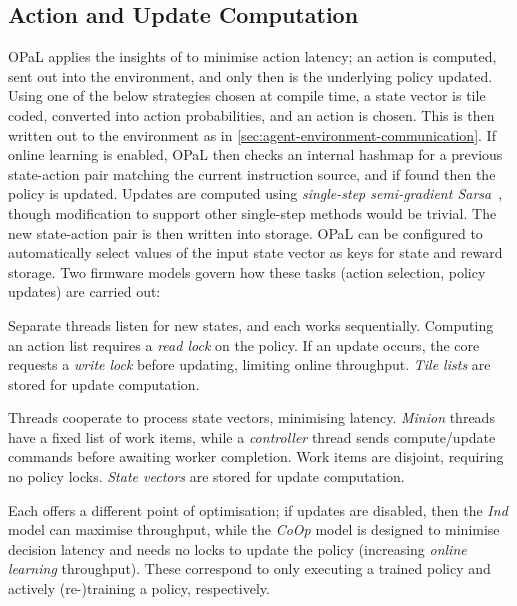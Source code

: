 \documentclass[
conference
,10pt
]{IEEEtran}
\newcommand{\approachshort}{OPaL}
\newcommand{\Coopfw}{\emph{CoOp}}
\newcommand{\coopfw}{\Coopfw}
\newcommand{\Indfw}{\emph{Ind}}
\newcommand{\indfw}{\Indfw}
\begin{document}
\subsection{Action and Update Computation}\label{sec:action-and-update-computation}
\approachshort{} applies the insights of \textcite{DBLP:journals/firai/TravnikMSP18} to minimise action latency; an action is computed, sent out into the environment, and only then is the underlying policy updated.
Using one of the below strategies chosen at compile time, a state vector is tile coded, converted into action probabilities, and an action is chosen.
This is then written out to the environment as in \cref{sec:agent-environment-communication}.
If online learning is enabled, \approachshort{} then checks an internal hashmap for a previous state-action pair matching the current instruction source, and if found then the policy is updated.
Updates are computed using \emph{single-step semi-gradient Sarsa}~\cite[pp. \numrange{217}{221}]{RL2E}, though modification to support other single-step methods would be trivial.
The new state-action pair is then written into storage.
\approachshort{} can be configured to automatically select values of the input state vector as keys for state and reward storage.
Two firmware models govern how these tasks (action selection, policy updates) are carried out:
\begin{LaTeXdescription}
	\item[\Indfw{} (\cref{fig:single-and-parallel:single})] Separate threads listen for new states, and each works sequentially. Computing an action list requires a \emph{read lock} on the policy. If an update occurs, the core requests a \emph{write lock} before updating, limiting online throughput. \emph{Tile lists} are stored for update computation.
	\item[\Coopfw{} (\cref{fig:single-and-parallel:parallel,alg:parsa})] Threads cooperate to process state vectors, minimising latency. \emph{Minion} threads have a fixed list of work items, while a \emph{controller} thread sends compute/update commands before awaiting worker completion. Work items are disjoint, requiring no policy locks. \emph{State vectors} are stored for update computation.
\end{LaTeXdescription}
Each offers a different point of optimisation; if updates are disabled, then the \indfw{} model can maximise throughput, while the \coopfw{} model is designed to minimise decision latency and needs no locks to update the policy (increasing \emph{online learning} throughput).
These correspond to only executing a trained policy and actively (re-)training a policy, respectively.
\end{document}
